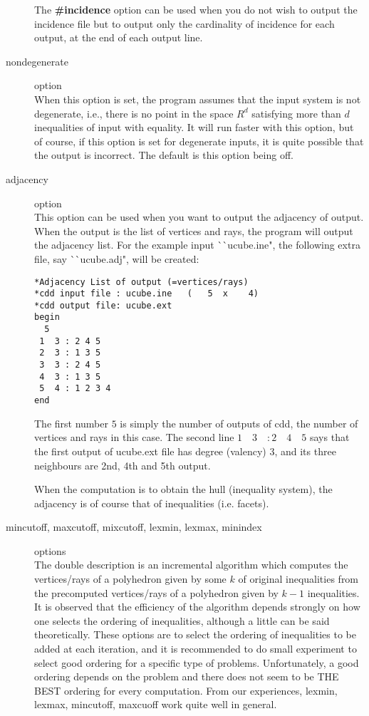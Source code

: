\begin{description}
The {\bf \#incidence} option can be used when you do not wish
to output the incidence file but to output only the cardinality of incidence
for each output, at the end of each output line.


\item[nondegenerate] option\\
When this option is set, the program assumes that the input system
is not degenerate, i.e., there is no point in the space $R^d$ satisfying
more than $d$ inequalities of input with equality.
It will run faster with this option, but of course, 
if this option is set for degenerate inputs, it is 
quite possible that the output is incorrect.  
The default is this option being off.

\item[adjacency] option\\
This option can be used when you want to output the adjacency of output.
When the output is the list of vertices and rays, the program will
output the adjacency list.  For the example input ^^ ^^ ucube.ine",
the following extra file, say ^^ ^^ ucube.adj", will be created:
\begin{verbatim}
*Adjacency List of output (=vertices/rays)
*cdd input file : ucube.ine   (   5  x    4)
*cdd output file: ucube.ext
begin
  5
 1  3 : 2 4 5
 2  3 : 1 3 5
 3  3 : 2 4 5
 4  3 : 1 3 5
 5  4 : 1 2 3 4
end
\end{verbatim}
The first number $5$ is simply the number of outputs of cdd, the
number of vertices and rays in this case.
The second line $ 1 \quad  3 \quad : 2 \quad  4 \quad  5$ says 
that the first output of
ucube.ext file has degree (valency) $3$, and its three neighbours are
2nd, 4th and 5th output.

When the computation is to obtain the hull (inequality system),
the adjacency is of course that of inequalities (i.e. facets).

\item[mincutoff, maxcutoff, mixcutoff, lexmin, lexmax, minindex] options\\
The double description is an incremental algorithm which
computes the vertices/rays of a polyhedron given by some $k$ of
original inequalities from the precomputed vertices/rays of a
polyhedron given by $k-1$ inequalities.  It is observed that
the efficiency of the algorithm depends strongly on how
one selects the ordering of inequalities, although a little
can be said theoretically.
These options are to select the ordering of inequalities to be
added at each iteration, and it is recommended to do small
experiment to select good ordering for a specific type of problems.
Unfortunately, a good ordering depends on the problem and there does not seem 
to be THE BEST ordering for every computation.  From our experiences,
lexmin, lexmax, mincutoff, maxcuoff work quite well in general.



\end{description}
